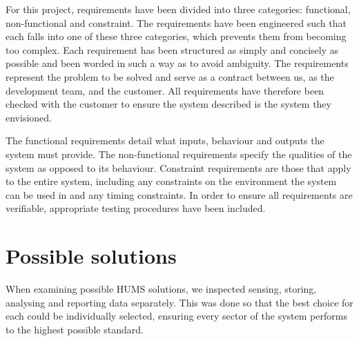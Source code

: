 \documentclass[10pt,a4paper]{article}
\begin{document}
For this project, requirements have been divided into three categories:
functional, non-functional and constraint. The requirements have been
engineered such that each falls into one of these three categories, which
prevents them from becoming too complex. Each requirement has been
structured as simply and concisely as possible and been worded in such a way
as to avoid ambiguity. The requirements represent the problem to be solved
and serve as a contract between us, as the development team, and the
customer. All requirements have therefore been checked with the customer to
ensure the system described is the system they envisioned.

The functional requirements detail what inputs, behaviour and outputs the system
must provide. The non-functional requirements specify the qualities of the
system as opposed to its behaviour. Constraint requirements are those that apply
to the entire system, including any constraints on the environment the system
can be used in and any timing constraints. In order to ensure all requirements
are verifiable, appropriate testing procedures have been included.







\section{Possible solutions}

When examining possible HUMS solutions, we inspected sensing, storing, analysing
and reporting data separately. This was done so that the best choice for each
could be individually selected, ensuring every sector of the system performs to
the highest possible standard.
\end{document}
